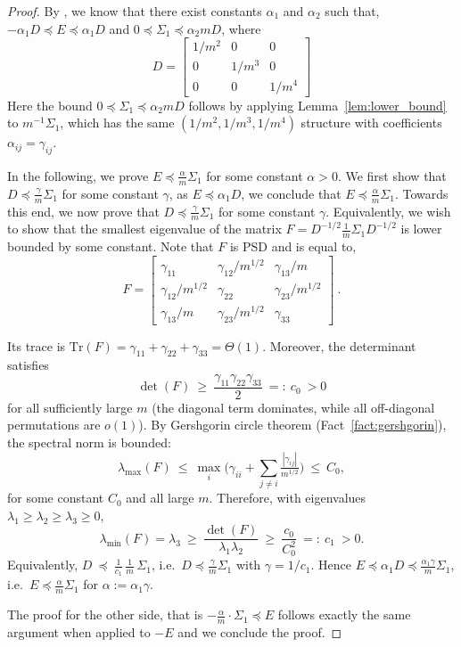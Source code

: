 \documentclass[10pt]{article} %
\theoremstyle{plain}
\begin{document}
\begin{proof}
	
	By , we know that there exist constants $\alpha_1$ and $\alpha_2$ such that, $-\alpha_1 D \preceq E \preceq \alpha_1 D$ and $0 \preceq \Sigma_1 \preceq \alpha_2m  D$, where 
	$$D=\begin{bmatrix}
		1/m^2 & 0 & 0\\
		0 & 1/m^3 & 0 \\
		0 & 0 & 1/m^4
	\end{bmatrix}$$
    Here the bound $0\preceq \Sigma_1 \preceq \alpha_2 m D$ follows by applying Lemma~\ref{lem:lower_bound} to $m^{-1}\Sigma_1$, which has the same $(1/m^2,1/m^3,1/m^4)$ structure with coefficients $\alpha_{ij}=\gamma_{ij}$.
    
	In the following, we prove $E \preceq \frac{\alpha}{m} \Sigma_{1}$ for some constant $\alpha >0$. We first show that $D \preceq \frac{\gamma}{m} \Sigma_1$ for some constant $\gamma$, as $E \preceq \alpha_1 D$, we conclude that $E \preceq \frac{\alpha}{m} \Sigma_{1}$. Towards this end, we now prove that $D \preceq \frac{\gamma}{m} \Sigma_1$ for some constant $\gamma$.
	Equivalently, we wish to show that the smallest eigenvalue of the matrix $F=D^{-1/2}\frac{1}{m}\Sigma_1 D^{-1/2}$ is lower bounded by some constant. Note that $F$ is PSD and is equal to,
	$$F=\begin{bmatrix}
		\gamma_{11} & \gamma_{12}/m^{1/2} & \gamma_{13}/m\\
		\gamma_{12}/m^{1/2} & \gamma_{22} & \gamma_{23}/m^{1/2} \\
		\gamma_{13}/m & \gamma_{23}/m^{1/2} & \gamma_{33}
	\end{bmatrix}~.$$

Its trace is $\mathrm{Tr}(F)=\gamma_{11}+\gamma_{22}+\gamma_{33}=\Theta(1)$. Moreover, the determinant satisfies
\[
\det(F)\ \ge\ \frac{\gamma_{11}\gamma_{22}\gamma_{33}}{2}\ =:\ c_0\ >0
\]
for all sufficiently large $m$ (the diagonal term dominates, while all off-diagonal permutations are $o(1)$).
By Gershgorin circle theorem (Fact~\ref{fact:gershgorin}), the spectral norm is bounded:
\[
\lambda_{\max}(F)\ \le\ \max_i\Big(\gamma_{ii}+\sum_{j\neq i}\tfrac{|\gamma_{ij}|}{m^{1/2}}\Big)\ \le\ C_0,
\]
for some constant $C_0$ and all large $m$. Therefore, with eigenvalues $\lambda_1\ge\lambda_2\ge\lambda_3\ge 0$,
\[
\lambda_{\min}(F)=\lambda_3\ \ge\ \frac{\det(F)}{\lambda_1\lambda_2}\ \ge\ \frac{c_0}{C_0^2}\ =:\ c_1\ >0.
\]
Equivalently, $D\ \preceq\ \tfrac{1}{c_1}\,\tfrac{1}{m}\,\Sigma_1$, i.e.\ $D\preceq \tfrac{\gamma}{m}\Sigma_1$ with $\gamma=1/c_1$. Hence $E\preceq \alpha_1 D\preceq \frac{\alpha_1\gamma}{m}\Sigma_1$, i.e.\ $E\preceq \frac{\alpha}{m}\Sigma_1$ for $\alpha:=\alpha_1\gamma$.

    
	
	
	The proof for the other side, that is $-\frac{\alpha}{m} \cdot \Sigma_1 \preceq E$ follows exactly the same argument when applied to $-E$ and we conclude the proof.
\end{proof}
\end{document}

